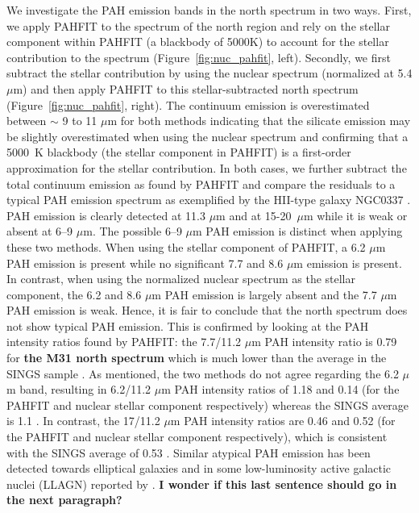 We investigate the PAH emission bands in the north spectrum in two ways. First, we apply PAHFIT \citep{Smith:2007lr} to the spectrum of the north region and rely on the stellar component within PAHFIT (a blackbody of 5000K) to account for the stellar contribution to the spectrum (Figure~\ref{fig:nuc_pahfit}, left). Secondly, we first subtract the stellar contribution by using the nuclear spectrum (normalized at 5.4 $\mu$m) and then apply PAHFIT to this stellar-subtracted north spectrum (Figure~\ref{fig:nuc_pahfit}, right). The continuum emission is overestimated between $\sim$ 9 to 11 $\mu$m for both methods indicating that the silicate emission may be slightly overestimated when using the nuclear spectrum and confirming that a 5000~K blackbody (the stellar component in PAHFIT) is a first-order approximation for the stellar contribution. In both cases, we further subtract the total continuum emission as found by PAHFIT and compare the residuals to a typical PAH emission spectrum as exemplified by the HII-type galaxy NGC0337 \citep{Smith:2007lr}. PAH emission is clearly detected at 11.3 $\mu$m and at 15-20~$\mu$m while it is weak or absent at 6--9 $\mu$m. The possible 6--9 $\mu$m PAH emission is distinct when applying these two methods. When using the stellar component of PAHFIT, a 6.2 $\mu$m PAH emission is present while no significant 7.7 and 8.6 $\mu$m emission is present. In contrast, when using the normalized nuclear spectrum as the stellar component, the 6.2 and 8.6 $\mu$m PAH emission is largely absent and the 7.7 $\mu$m PAH emission is weak. Hence, it is fair to conclude that the north spectrum does not show typical PAH emission. This is confirmed by looking at the PAH intensity ratios found by PAHFIT: the 7.7/11.2 $\mu$m PAH intensity ratio is 0.79 for {\bf the M31 north spectrum} which is much lower than the average in the SINGS sample \citep[3.6,][]{Smith:2007lr}. As mentioned, the two methods do not agree regarding the 6.2 $\mu$m band, resulting in 6.2/11.2 $\mu$m PAH intensity ratios of 1.18 and 0.14 (for the PAHFIT and nuclear stellar component respectively) whereas the SINGS average is 1.1 \citep{Smith:2007lr}. In contrast, the 17/11.2 $\mu$m PAH intensity ratios are 0.46 and 0.52 (for the PAHFIT and nuclear stellar component respectively), which is consistent with the SINGS average of 0.53 \citep{Smith:2007lr}. Similar atypical PAH emission has been detected towards elliptical galaxies \citep[e.g.][]{Kaneda:08, Vega:10} and in some low-luminosity active galactic nuclei (LLAGN) reported by \citet{Smith:2007lr}.  {\bf I wonder if this last sentence should go in the next paragraph?}



